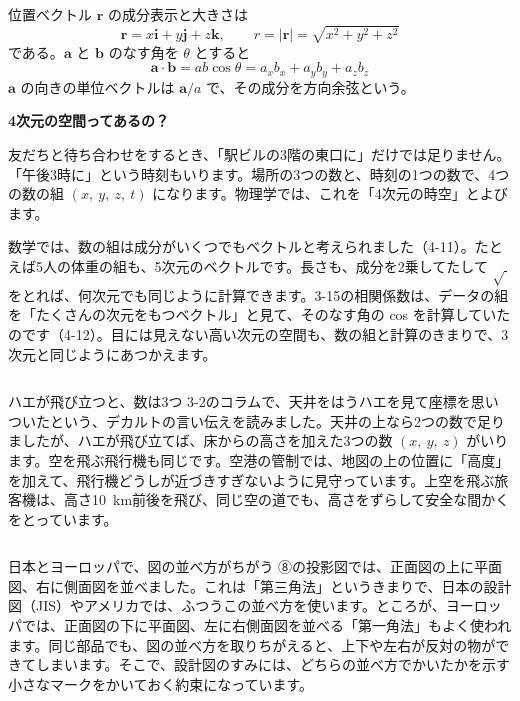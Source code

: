 \begin{senmonsho}[空間ベクトルの書き方]
\begin{bkhonbun}
位置ベクトル $\symbf r$ の成分表示と大きさは
\[ \symbf r=x\symbf i+y\symbf j+z\symbf k,\qquad r=|\symbf r|=\sqrt{x^2+y^2+z^2} \]
である。$\symbf a$ と $\symbf b$ のなす角を $\theta$ とすると
\[ \symbf a\cdot\symbf b=ab\cos\theta=a_xb_x+a_yb_y+a_zb_z \]
$\symbf a$ の向きの単位ベクトルは $\symbf a/a$ で、その成分を方向余弦という。
\end{bkhonbun}
\end{senmonsho}

\begin{motto}[3]
\textbf{4次元の空間ってあるの？}\par
友だちと待ち合わせをするとき、「駅ビルの3階の東口に」だけでは足りません。「午後3時に」という時刻もいります。場所の3つの数と、時刻の1つの数で、4つの数の組 $(x,\ y,\ z,\ t)$ になります。物理学では、これを「4次元の時空」とよびます。

数学では、数の組は成分がいくつでもベクトルと考えられました（4-11）。たとえば5人の体重の組も、5次元のベクトルです。長さも、成分を2乗してたして $\sqrt{\ }$ をとれば、何次元でも同じように計算できます。3-15の相関係数は、データの組を「たくさんの次元をもつベクトル」と見て、そのなす角の cos を計算していたのです（4-12）。目には見えない高い次元の空間も、数の組と計算のきまりで、3次元と同じようにあつかえます。
\end{motto}

\begin{column}{ハエが飛び立つと、数は3つ}
3-2のコラムで、天井をはうハエを見て座標を思いついたという、デカルトの言い伝えを読みました。天井の上なら2つの数で足りましたが、ハエが飛び立てば、床からの高さを加えた3つの数 $(x,\ y,\ z)$ がいります。空を飛ぶ飛行機も同じです。空港の管制では、地図の上の位置に「高度」を加えて、飛行機どうしが近づきすぎないように見守っています。上空を飛ぶ旅客機は、高さ\qty{10}{km}前後を飛び、同じ空の道でも、高さをずらして安全な間かくをとっています。
\end{column}

\begin{column}{日本とヨーロッパで、図の並べ方がちがう}
⑧の投影図では、正面図の上に平面図、右に側面図を並べました。これは「第三角法」というきまりで、日本の設計図（JIS）やアメリカでは、ふつうこの並べ方を使います。ところが、ヨーロッパでは、正面図の下に平面図、左に右側面図を並べる「第一角法」もよく使われます。同じ部品でも、図の並べ方を取りちがえると、上下や左右が反対の物ができてしまいます。そこで、設計図のすみには、どちらの並べ方でかいたかを示す小さなマークをかいておく約束になっています。
\end{column}


